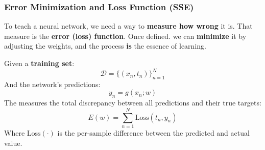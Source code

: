 \subsubsection{Error Minimization and Loss Function (SSE)}\label{sec:error-minimization-and-loss-function}

To teach a neural network, we need a way to \textbf{measure how wrong} it is. That measure is the \textbf{error (loss) function}. Once defined. we can \textbf{minimize} it by adjusting the weights, and the process \textbf{is} the essence of learning.

\highspace
\begin{definitionbox}
    Given a \textbf{training set}:
    \begin{equation}
        \mathcal{D} = \Biggl\{\left(x_{n}, t_{n}\right)\Biggr\}_{n=1}^{N}
    \end{equation}
    And the network's predictions:
    \begin{equation}
        y_{n} = g\left(x_{n}; w\right)
    \end{equation}
    The  measures the total discrepancy between all predictions and their true targets:
    \begin{equation}
        E(w) = \displaystyle\sum_{n=1}^{N} \text{Loss}(t_{n}, y_{n})
    \end{equation}
    Where $\text{Loss}\left(\cdot\right)$ is the per-sample difference between the predicted and actual value.
\end{definitionbox}

